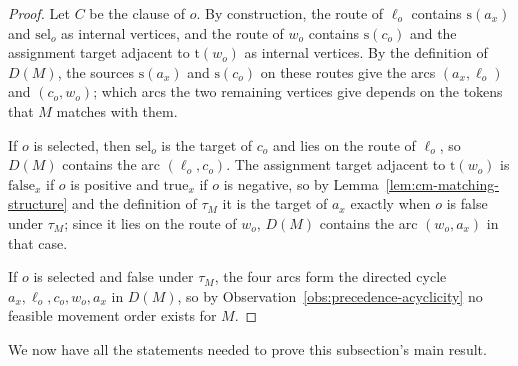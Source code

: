 \documentclass[a4paper,USenglish,thm-restate]{lipics-v2021}
\newcommand{\src}{\mathrm{s}}
\newcommand{\tgt}{\mathrm{t}}
\theoremstyle{problemstyle}
\begin{document}
\begin{proof}
Let $C$ be the clause of $o$. By construction, the route of $\ell_o$
contains $\src(a_x)$ and $\mathrm{sel}_o$ as internal vertices, and the
route of $w_o$ contains $\src(c_o)$ and the assignment target adjacent to
$\tgt(w_o)$ as internal vertices. By the definition of $D(M)$, the sources
$\src(a_x)$ and $\src(c_o)$ on these routes give the arcs $(a_x,\ell_o)$
and $(c_o,w_o)$; which arcs the two remaining vertices give depends on the tokens that $M$ matches with them.

If $o$ is selected, then $\mathrm{sel}_o$ is the target of $c_o$ and lies
on the route of $\ell_o$, so $D(M)$ contains the arc $(\ell_o,c_o)$. The
assignment target adjacent to $\tgt(w_o)$ is $\mathrm{false}_x$ if $o$ is
positive and $\mathrm{true}_x$ if $o$ is negative, so by
Lemma~\ref{lem:cm-matching-structure} and the definition of $\tau_M$ it is
the target of $a_x$ exactly when $o$ is false under $\tau_M$; since it
lies on the route of $w_o$, $D(M)$ contains the arc $(w_o,a_x)$ in that
case.

If $o$ is selected and false under $\tau_M$, the four arcs form the
directed cycle $a_x,\ell_o,c_o,w_o,a_x$ in $D(M)$, so by
Observation~\ref{obs:precedence-acyclicity} no feasible movement order
exists for $M$.
\end{proof}

We now have all the statements needed to prove this subsection's main result.

\candidateMultiplicityHardness*
\end{document}
